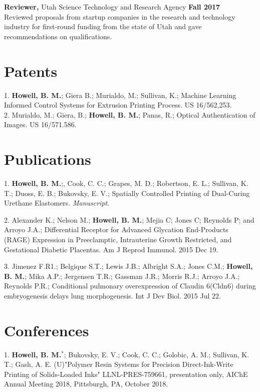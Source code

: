 \documentclass[margin,line]{res}
\begin{document}
\begin{resume}
{\bf Reviewer,} Utah Science Technology and Research Agency
\hfill {\bf Fall 2017}\\
Reviewed proposals from startup companies in the research and technology industry for first-round funding from the state of Utah and gave recommendations on qualifications. 


\section{\sc Patents}
1. \textbf{Howell, B. M.}; Giera B.; Murialdo, M.; Sullivan, K.; Machine Learning Informed Control Systems for Extrusion Printing Process. US 16/562,253. \\

2. Murialdo, M.; Giera, B.; \textbf{Howell, B. M.}; Panas, R.; Optical Authentication of Images. US 16/571.586. 

\section{\sc Publications}
1. \textbf{Howell, B. M.};, Cook, C. C.; Grapes, M. D.; Robertson, E. L.; Sullivan, K. T.; Duoss, E. B.; Bukovsky, E. V.; Spatially Controlled Printing of Dual-Curing Urethane Elastomers. \textit{Manuscript}.   

2. Alexander K.; Nelson M.; \textbf{Howell, B. M.}; Mejia C; Jones C; Reynolds P; and Arroyo J.A.; Differential Receptor for Advanced Glycation End-Products (RAGE) Expression in Preeclamptic, Intrauterine Growth Restricted, and Gestational Diabetic Placentas. Am J Reprod Immunol. 2015 Dec 19.

3. Jimenez F.R1.; Belgique S.T.; Lewis J.B.; Albright S.A.; Jones C.M.; \textbf{Howell, B. M.}; Mika A.P.; Jergensen T.R.; Gassman J.R.; Morris R.J.; Arroyo J.A.; Reynolds P.R.; Conditional pulmonary overexpression of Claudin 6(Cldn6) during embryogenesis delays lung morphogenesis. Int J Dev Biol. 2015 Jul 22.

\section{\sc Conferences}
1. \textbf{Howell, B. M.}$^*$; Bukovsky, E. V.; Cook, C. C.; Golobic, A. M.; Sullivan, K. T.; Gash, A. E. (U)"Polymer Resin Systems for Precision Direct-Ink-Write Printing of Solids-Loaded Inks" LLNL-PRES-759661, presentation only, AIChE Annual Meeting 2018, Pittsburgh, PA, October 2018.\\


\end{resume}
\end{document}
